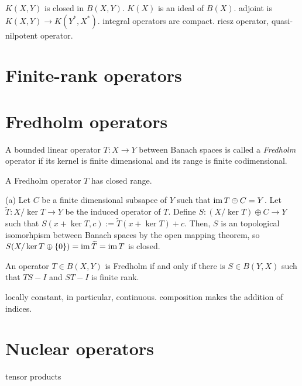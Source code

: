 \documentclass{../note}
\begin{document}
$K(X,Y)$ is closed in $B(X,Y)$.
$K(X)$ is an ideal of $B(X)$.
adjoint is $K(X,Y)\to K(Y^*,X^*)$.
integral operators are compact.
riesz operator, quasi-nilpotent operator.

\section{Finite-rank operators}
\section{Fredholm operators}

\begin{prb}
A bounded linear operator $T:X\to Y$ between Banach spaces is called a \emph{Fredholm} operator if its kernel is finite dimensional and its range is finite codimensional.
\begin{parts}
\item A Fredholm operator $T$ has closed range.
\end{parts}
\end{prb}
\begin{pf}
(a)
Let $C$ be a finite dimensional subsapce of $Y$ such that $\operatorname{im} T\oplus C=Y$.
Let $\tilde T:X/\ker T\to Y$ be the induced operator of $T$.
Define $S:(X/\ker T)\oplus C\to Y$ such that $S(x+\ker T,c):=\tilde T(x+\ker T)+c$.
Then, $S$ is an topological isomorhpism between Banach spaces by the open mapping theorem, so $S(X/\ker T\oplus\{0\})=\operatorname{im}\widetilde T=\operatorname{im} T$ is closed.
\end{pf}

\begin{prb}
An operator $T\in B(X,Y)$ is Fredholm if and only if there is $S\in B(Y,X)$ such that $TS-I$ and $ST-I$ is finite rank.
\end{prb}

\begin{prb}
locally constant, in particular, continuous.
composition makes the addition of indices.
\end{prb}

\section{Nuclear operators}
tensor products
\end{document}
